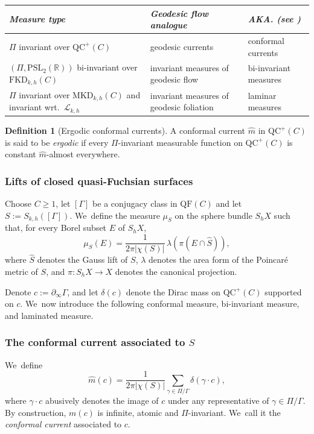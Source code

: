 \documentclass[11pt]{article}
\theoremstyle{plain}
\theoremstyle{definition}
\newtheorem{defi}[theorem]{Definition}
\newcommand\PSL{\mathrm{PSL}_2(\mathbb{R})}
\newcommand{\cL}{{\mathcal L}}
\newcommand{\QF}{\mathrm{QF}}
\newcommand{\QC}{\mathrm{QC}}
\newcommand{\MKD}{\mathrm{MKD}}
\newcommand{\FKD}{\mathrm{FKD}}
\newcommand{\bord}{\partial_{\infty}}
\begin{document}
\medskip
\begin{center}
\begin{tabularx}{\textwidth}{|>{\raggedright\arraybackslash}p{5cm}
|>{\raggedright\arraybackslash}X
|>{\raggedright\arraybackslash}X|}
\hline
\small\emph{Measure type} &
\small\emph{Geodesic flow analogue} &
\small\emph{AKA. (see \cite{LabourieBourbaki,MN_currents})} \\
\hline
\small $\Pi$ invariant over $\QC^+(C)$ &
\small geodesic currents &
\small conformal currents \\
\small $(\Pi,\PSL)$ bi-invariant over $\FKD_{k,h}(C)$ &
\small invariant measures of geodesic flow &
\small bi-invariant measures \\
\small $\Pi$ invariant over $\MKD_{k,h}(C)$ and invariant wrt.\ $\cL_{k,h}$ &
\small invariant measures of geodesic foliation &
\small laminar measures \\
\hline
\end{tabularx}
\end{center}

\begin{defi}[Ergodic conformal currents]
A conformal current $\hat m$ in $\QC^+(C)$ is said to be \emph{ergodic} if every $\Pi$-invariant measurable function on $\QC^+(C)$ is constant $\hat m$-almost everywhere.
\end{defi}

\subsubsection{Lifts of closed quasi-Fuchsian surfaces}\label{sss.lifts} Choose $C\geq 1$, let $[\Gamma]$ be a conjugacy class in $\QF(C)$ and let $S:=S_{k,h}([\Gamma])$. We~define the measure $\mu_S$ on the sphere bundle $S_h X$ such that, for every Borel subset $E$ of $S_h X$,
\begin{equation}\label{eq.inv_measure}
\mu_S(E)=\frac{1}{2\pi|\chi(S)|}\,\lambda(\pi(E\cap\hat S)),
\end{equation}
where $\hat S$ denotes the Gauss lift of $S$, $\lambda$ denotes the area form of the Poincaré metric of $S$, and $\pi:S_hX\to X$ denotes the canonical projection.

Denote $c:=\bord\Gamma$, and let $\delta(c)$ denote the Dirac mass on $\QC^+(C)$ supported on $c$. We~now introduce the following conformal measure, bi-invariant measure, and laminated measure.

\subsubsection*{The conformal current associated to $S$}
We~define
\begin{equation*}
\hat m(c)=\frac{1}{2\pi|\chi(S)|}\sum_{\gamma\in\Pi/\Gamma}\delta(\gamma\cdot c),
\end{equation*}
where $\gamma\cdot c$ abusively denotes the image of $c$ under any representative of $\gamma\in\Pi/\Gamma$. By construction, $m(c)$ is infinite, atomic and $\Pi$-invariant. We~call it the \emph{conformal current} associated to $c$.
\end{document}
